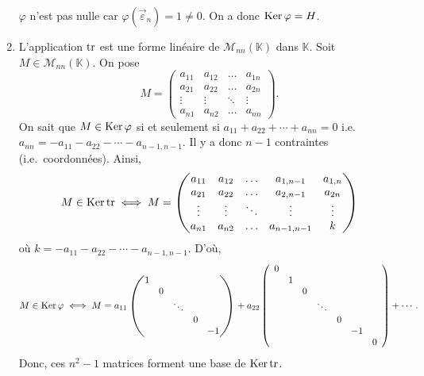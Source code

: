 \begin{exo}
\begin{enumerate}
			$\varphi$\/ n'est pas nulle car $\varphi(\vec{\varepsilon}_n) = 1 \neq 0$. On a donc $\operatorname{Ker} \varphi = H$.
		\item L'application $\operatorname{tr}$\/ est une forme linéaire de $\mathscr{M}_{nn}(\mathds{K})$\/ dans $\mathds{K}$. Soit $M \in \mathscr{M}_{nn}(\mathds{K})$. On pose \[
				M = \begin{pmatrix}
					a_{11}&a_{12}&\ldots&a_{1n}\\
					a_{21}&a_{22}&\ldots&a_{2n}\\
					\vdots&\vdots&\ddots&\vdots\\
					a_{n1}&a_{n2}&\ldots&a_{nn}
				\end{pmatrix}
			.\]
			On sait que $M \in \operatorname{Ker} \varphi$\/ si et seulement si $a_{11} + a_{22} + \cdots + a_{nn} = 0$ i.e.\ $a_{nn} = -a_{11}-a_{22}-\cdots-a_{n-1,n-1}$. Il y a donc $n - 1$\/ contraintes (i.e.\ coordonnées). Ainsi, \[
				M \in \operatorname{Ker}\operatorname{tr} \iff M = \begin{pmatrix}
					a_{11}&a_{12}&\ldots&a_{1,n-1}&a_{1,n}\\
					a_{21}&a_{22}&\ldots&a_{2,n-1}&a_{2n}\\
					\vdots&\vdots&\ddots&\vdots&\vdots\\
					a_{n1}&a_{n2}&\ldots&a_{n-1,n-1}&k
				\end{pmatrix}
			\] où  $k = -a_{11}-a_{22}-\cdots-a_{n-1,n-1}$. D'où,
			\[
				M \in \operatorname{Ker} \varphi \iff M = a_{11} \begin{pmatrix}
					1\\
					&0\\
					&&\ddots\\
					&&&0\\
					&&&&-1
				\end{pmatrix} + a_{22} \left(\begin{array}{cccccccc}
					0\\
					&1\\
					&&0\\
					&&&\ddots\\
					&&&&0\\
					&&&&&-1\\
					&&&&&&0\\
				\end{array} \right) + \cdots
			.\] Donc, ces $n^2 - 1$\/ matrices forment une base de $\operatorname{Ker} \operatorname{tr}$.
			
	\end{enumerate}
\end{exo}

